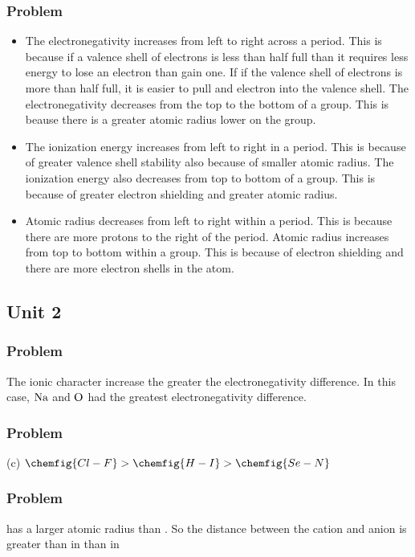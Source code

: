 \documentclass{article}
\begin{document}
\subsubsection*{Problem \countThis}
\begin{itemize}
\item The electronegativity increases from left to right across a period. This is because if a valence shell of electrons is less than half full than
it requires less energy to lose an electron than gain one. If if the valence shell of electrons is more than half full, it is easier to pull and electron
into the valence shell. The electronegativity decreases from the top to the bottom of a group. This is beause there is a greater atomic radius lower on the group.

\item The ionization energy increases from left to right in a period. This is because of greater valence shell stability also because of smaller atomic radius. The ionization energy also decreases
from top to bottom of a group. This is because of greater electron shielding and greater atomic radius. 

\item Atomic radius decreases from left to right within a period. This is because there are more protons to the right of the period. Atomic radius increases from top to bottom within a group.
 This is because of electron shielding and there are more electron shells in the atom. 
\end{itemize}  
\subsection{Unit 2}
\subsubsection*{Problem \countThis}
The ionic character increase the greater the electronegativity difference. In this case, \(\ce{Na}\) and \(\ce{O}\) had the greatest electronegativity difference. 
\subsubsection*{Problem \countThis}
(c) \(\chemfig{Cl-F} > \chemfig{H-I} > \chemfig{Se-N}\)
\subsubsection*{Problem \countThis}
 has a larger atomic radius than . So the distance between the cation and anion is greater than in  than in 
\end{document}

